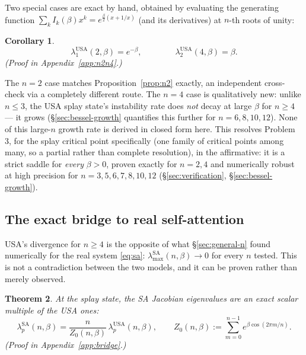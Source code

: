 \documentclass[11pt]{article}
\newtheorem{theorem}{Theorem}
\newtheorem{corollary}[theorem]{Corollary}
\begin{document}
Two special cases are exact by hand, obtained by evaluating the generating function $\sum_k I_k(\beta)x^k=e^{\frac{\beta}{2}(x+1/x)}$ (and its derivatives) at $n$-th roots of unity:

\begin{corollary}
\label{cor:n2n4}
\begin{equation}
    \lambda_1^{\mathrm{USA}}(2,\beta) = e^{-\beta}, \qquad\qquad \lambda_2^{\mathrm{USA}}(4,\beta) = \beta.
    \label{eq:exact-cases}
\end{equation}
(Proof in Appendix~\ref{app:n2n4}.)
\end{corollary}

The $n=2$ case matches Proposition~\ref{prop:n2} exactly, an independent cross-check via a completely different route. The $n=4$ case is qualitatively new: unlike $n\le3$, the USA splay state's instability rate does \emph{not} decay at large $\beta$ for $n\ge4$ --- it grows (\S\ref{sec:bessel-growth} quantifies this further for $n=6,8,10,12$). None of this large-$n$ growth rate is derived in closed form here. This resolves Problem 3, for the splay critical point specifically (one family of critical points among many, so a partial rather than complete resolution), in the affirmative: it is a strict saddle for \emph{every} $\beta>0$, proven exactly for $n=2,4$ and numerically robust at high precision for $n=3,5,6,7,8,10,12$ (\S\ref{sec:verification}, \S\ref{sec:bessel-growth}).

\subsection{The exact bridge to real self-attention}
\label{sec:bridge}

USA's divergence for $n\ge4$ is the opposite of what \S\ref{sec:general-n} found numerically for the real system \eqref{eq:sa}: $\lambda_{\max}^{\mathrm{SA}}(n,\beta)\to0$ for every $n$ tested. This is not a contradiction between the two models, and it can be proven rather than merely observed.

\begin{theorem}
\label{thm:bridge}
At the splay state, the SA Jacobian eigenvalues are an exact scalar multiple of the USA ones:
\begin{equation}
    \lambda_p^{\mathrm{SA}}(n,\beta) = \frac{n}{Z_0(n,\beta)}\,\lambda_p^{\mathrm{USA}}(n,\beta), \qquad Z_0(n,\beta):=\sum_{m=0}^{n-1}e^{\beta\cos(2\pi m/n)}.
    \label{eq:bridge}
\end{equation}
(Proof in Appendix~\ref{app:bridge}.)
\end{theorem}
\end{document}
